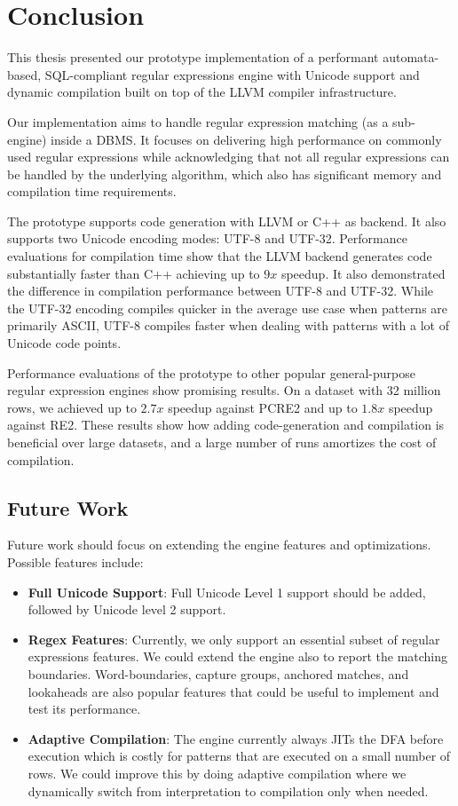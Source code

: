 \chapter{Conclusion}\label{chapter:conclusion}
This thesis presented our prototype implementation of a performant automata-based, SQL-compliant regular expressions engine with Unicode support and dynamic compilation built on top of the LLVM compiler infrastructure.

Our implementation aims to handle regular expression matching (as a sub-engine) inside a DBMS. It focuses on delivering high performance on commonly used regular expressions while acknowledging that not all regular expressions can be handled by the underlying algorithm, which also has significant memory and compilation time requirements.

The prototype supports code generation with LLVM or C++ as backend. It also supports two Unicode encoding modes: UTF-8 and UTF-32. Performance evaluations for compilation time show that the LLVM backend generates code substantially faster than C++ achieving up to $9x$ speedup. It also demonstrated the difference in compilation performance between UTF-8 and UTF-32. While the UTF-32 encoding compiles quicker in the average use case when patterns are primarily ASCII, UTF-8 compiles faster when dealing with patterns with a lot of Unicode code points. 

Performance evaluations of the prototype to other popular general-purpose regular expression engines show promising results. On a dataset with 32 million rows, we achieved up to $2.7x$ speedup against PCRE2 and up to $1.8x$ speedup against RE2. These results show how adding code-generation and compilation is beneficial over large datasets, and a large number of runs amortizes the cost of compilation.

\section{Future Work}\label{futurework}

Future work should focus on extending the engine features and optimizations. Possible features include:
\begin{itemize}
    \item \textbf{Full Unicode Support}: Full Unicode Level 1 support should be added, followed by Unicode level 2 support.
    \item \textbf{Regex Features}: Currently, we only support an essential subset of regular expressions features. We could extend the engine also to report the matching boundaries. Word-boundaries, capture groups, anchored matches, and lookaheads are also popular features that could be useful to implement and test its performance.
    \item \textbf{Adaptive Compilation}: The engine currently always JITs the DFA before execution which is costly for patterns that are executed on a small number of rows. We could improve this by doing adaptive compilation where we dynamically switch from interpretation to compilation only when needed.
\end{itemize}


